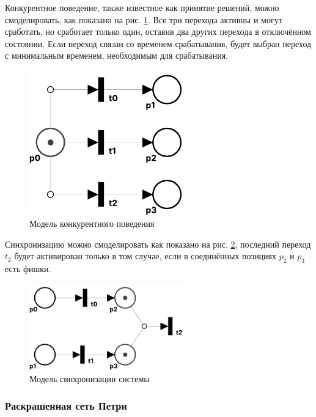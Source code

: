\clearpage

Конкурентное поведение, также известное как принятие решений, можно смоделировать, как показано на рис. \ref{fig:competetive}. Все три перехода активны и могут сработать, но сработает только один, оставив два других перехода в отключённом состоянии. Если переход связан со временем срабатывания, будет выбран переход с минимальным временем, необходимым для срабатывания.

\begin{figure}[h!btp]
	\centering
	\includegraphics[width=0.6\textwidth]{inc/competetive.pdf}
	\caption{Модель конкурентного поведения}
	\label{fig:competetive}
\end{figure}

Синхронизацию можно смоделировать как показано на рис. \ref{fig:sync}, последний переход $t_2$ будет активирован только в том случае, если в соединённых позициях $p_2$ и $p_3$ есть фишки.

\begin{figure}[h!btp]
	\centering
	\includegraphics[width=0.6\textwidth]{inc/sync.pdf}
	\caption{Модель синхронизации системы}
	\label{fig:sync}
\end{figure}

\subsubsection{Раскрашенная сеть Петри}

